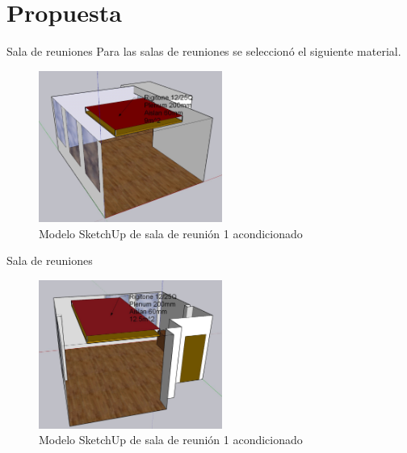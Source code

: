 \documentclass{sintefbeamer}
\begin{document}
\section{Propuesta}
\begin{frame}{Sala de reuniones}
    Para las salas de reuniones se seleccionó el siguiente material.
    \begin{figure}
        \centering
        \includegraphics[width=6cm]{images/Propuesta/propuesta_reunion1.jpg}
        \caption{Modelo SketchUp de sala de reunión 1 acondicionado}
        \label{fig:modelo sketchup sala 1 acond}
    \end{figure}
\end{frame}
\begin{frame}{Sala de reuniones}
    \begin{figure}
        \centering
        \includegraphics[width=6cm]{images/Propuesta/propuesta_reunion2.jpg}
        \caption{Modelo SketchUp de sala de reunión 1 acondicionado}
        \label{fig:modelo sketchup sala 2 acond}
    \end{figure}
    
\end{frame}
\end{document}
